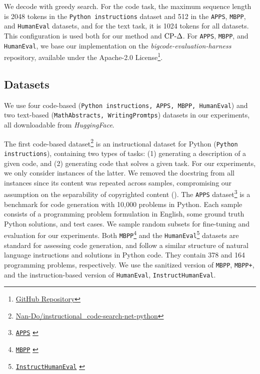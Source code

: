 We decode with greedy search. For the code task, the maximum sequence length is 2048 tokens in the \texttt{Python instructions} dataset and 512 in the \texttt{APPS}, \texttt{MBPP}, and \texttt{HumanEval} datasets, and for the text task, it is 1024 tokens for all datasets. This configuration is used both for our method and $\text{CP-}\Delta$. For \texttt{APPS}, \texttt{MBPP}, and \texttt{HumanEval}, we base our implementation on the \emph{bigcode-evaluation-harness} repository, available under the Apache-2.0 License\footnote{\href{https://github.com/bigcode-project/bigcode-evaluation-harness}{GitHub Repository}}.

\subsection{Datasets}
\label{app:datasets}

We use four code-based (\texttt{Python instructions, APPS, MBPP, HumanEval}) and two text-based (\texttt{MathAbstracts, WritingPromtps}) datasets in our experiments, all downloadable from \emph{HuggingFace}. 

The first code-based dataset\footnote{\href{https://huggingface.co/datasets/Nan-Do/instructional_code-search-net-python?row=0}{Nan-Do/instructional\_code-search-net-python}} is an instructional dataset for Python (\texttt{Python instructions}), containing two types of tasks: (1) generating a description of a given code, and (2) generating code that solves a given task. For our experiments, we only consider instances of the latter. We removed the docstring from all instances since its content was repeated across samples, compromising our assumption on the separability of copyrighted content (). The \texttt{APPS} dataset\footnote{\href{https://huggingface.co/datasets/codeparrot/apps}{\texttt{APPS}} \citep{hendrycksapps2021}} is a benchmark for code generation with 10,000 problems in Python. Each sample consists of a programming problem formulation in English, some ground truth Python solutions, and test cases. We sample random subsets for fine-tuning and evaluation for our experiments. Both \texttt{MBPP}\footnote{\href{https://huggingface.co/datasets/google-research-datasets/mbpp}{\texttt{MBPP}} \citep{austin2021program}} and the \texttt{HumanEval}\footnote{\href{https://huggingface.co/datasets/codeparrot/instructhumaneval}{\texttt{InstructHumanEval}} \citep{chen2021evaluating}} datasets are standard for assessing code generation, and follow a similar structure of natural language instructions and solutions in Python code. They contain 378 and 164 programming problems, respectively. We use the sanitized version of \texttt{MBPP}, \texttt{MBPP+}, and the instruction-based version of \texttt{HumanEval}, \texttt{InstructHumanEval}.

